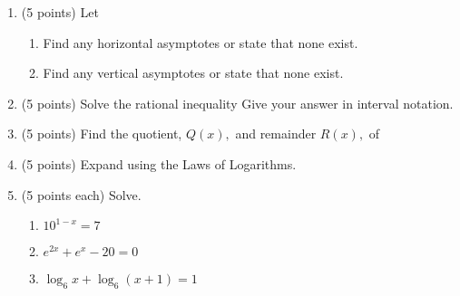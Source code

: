 \documentclass[12pt]{article}
\begin{document}
\begin{enumerate}
\begin{enumerate}
\begin{minipage}[c]{10cm}
\begin{tikzpicture}[scale=0.7]
\end{tikzpicture}
\end{minipage}
\end{enumerate}
\vfill
\newpage
\item (5 points) Let 
\begin{enumerate}
\item Find any horizontal asymptotes or state that none exist.
\vspace{.6in}
\item Find any vertical asymptotes or state that none exist.
\vspace{.6in}
\end{enumerate}
\item (5 points) Solve the rational inequality  Give your answer in interval notation.
\vfill
\item (5 points) Find the quotient, $Q(x),$ and remainder  $R(x),$ of 
\vfill
\newpage
\item (5 points) Expand  using the Laws of Logarithms.
\vfill
\item (5 points each) Solve.
\begin{enumerate}
\item $10^{1-x}=7$
\vfill
\item $e^{2x}+e^{x}-20=0$
\vfill
\item $\log_6 x +\log_6 (x+1)=1$
\vfill

\end{enumerate}
\newpage


\end{enumerate}
\end{document}
